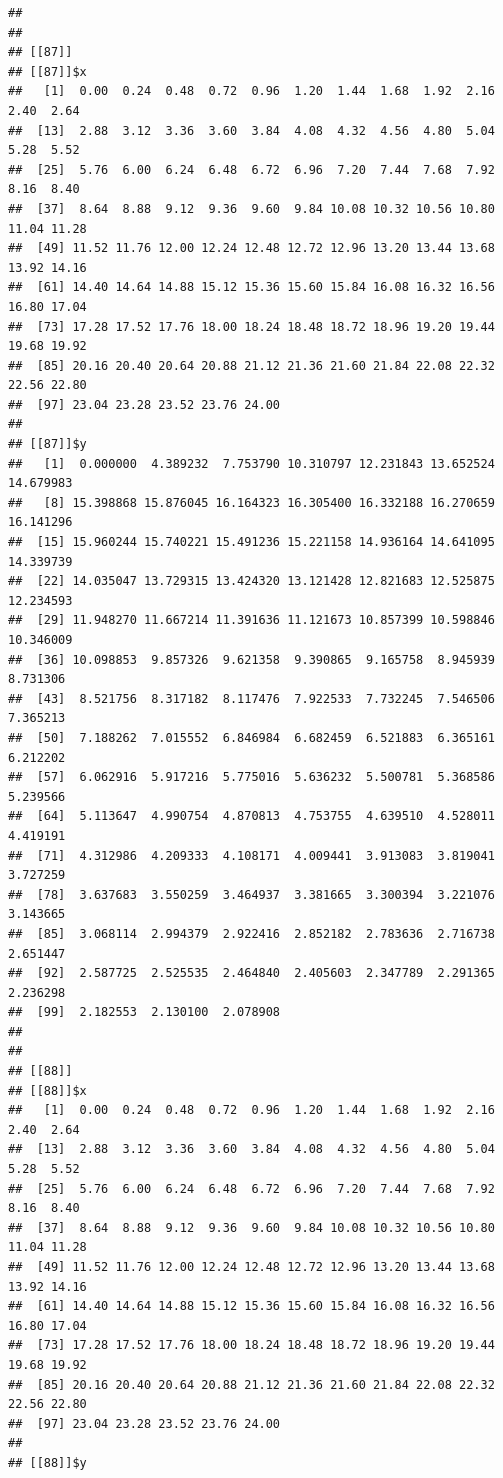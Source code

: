 \documentclass[
  ignorenonframetext,
]{beamer}
\begin{document}
\begin{frame}[fragile]{}
\begin{verbatim}
## 
## 
## [[87]]
## [[87]]$x
##   [1]  0.00  0.24  0.48  0.72  0.96  1.20  1.44  1.68  1.92  2.16  2.40  2.64
##  [13]  2.88  3.12  3.36  3.60  3.84  4.08  4.32  4.56  4.80  5.04  5.28  5.52
##  [25]  5.76  6.00  6.24  6.48  6.72  6.96  7.20  7.44  7.68  7.92  8.16  8.40
##  [37]  8.64  8.88  9.12  9.36  9.60  9.84 10.08 10.32 10.56 10.80 11.04 11.28
##  [49] 11.52 11.76 12.00 12.24 12.48 12.72 12.96 13.20 13.44 13.68 13.92 14.16
##  [61] 14.40 14.64 14.88 15.12 15.36 15.60 15.84 16.08 16.32 16.56 16.80 17.04
##  [73] 17.28 17.52 17.76 18.00 18.24 18.48 18.72 18.96 19.20 19.44 19.68 19.92
##  [85] 20.16 20.40 20.64 20.88 21.12 21.36 21.60 21.84 22.08 22.32 22.56 22.80
##  [97] 23.04 23.28 23.52 23.76 24.00
## 
## [[87]]$y
##   [1]  0.000000  4.389232  7.753790 10.310797 12.231843 13.652524 14.679983
##   [8] 15.398868 15.876045 16.164323 16.305400 16.332188 16.270659 16.141296
##  [15] 15.960244 15.740221 15.491236 15.221158 14.936164 14.641095 14.339739
##  [22] 14.035047 13.729315 13.424320 13.121428 12.821683 12.525875 12.234593
##  [29] 11.948270 11.667214 11.391636 11.121673 10.857399 10.598846 10.346009
##  [36] 10.098853  9.857326  9.621358  9.390865  9.165758  8.945939  8.731306
##  [43]  8.521756  8.317182  8.117476  7.922533  7.732245  7.546506  7.365213
##  [50]  7.188262  7.015552  6.846984  6.682459  6.521883  6.365161  6.212202
##  [57]  6.062916  5.917216  5.775016  5.636232  5.500781  5.368586  5.239566
##  [64]  5.113647  4.990754  4.870813  4.753755  4.639510  4.528011  4.419191
##  [71]  4.312986  4.209333  4.108171  4.009441  3.913083  3.819041  3.727259
##  [78]  3.637683  3.550259  3.464937  3.381665  3.300394  3.221076  3.143665
##  [85]  3.068114  2.994379  2.922416  2.852182  2.783636  2.716738  2.651447
##  [92]  2.587725  2.525535  2.464840  2.405603  2.347789  2.291365  2.236298
##  [99]  2.182553  2.130100  2.078908
## 
## 
## [[88]]
## [[88]]$x
##   [1]  0.00  0.24  0.48  0.72  0.96  1.20  1.44  1.68  1.92  2.16  2.40  2.64
##  [13]  2.88  3.12  3.36  3.60  3.84  4.08  4.32  4.56  4.80  5.04  5.28  5.52
##  [25]  5.76  6.00  6.24  6.48  6.72  6.96  7.20  7.44  7.68  7.92  8.16  8.40
##  [37]  8.64  8.88  9.12  9.36  9.60  9.84 10.08 10.32 10.56 10.80 11.04 11.28
##  [49] 11.52 11.76 12.00 12.24 12.48 12.72 12.96 13.20 13.44 13.68 13.92 14.16
##  [61] 14.40 14.64 14.88 15.12 15.36 15.60 15.84 16.08 16.32 16.56 16.80 17.04
##  [73] 17.28 17.52 17.76 18.00 18.24 18.48 18.72 18.96 19.20 19.44 19.68 19.92
##  [85] 20.16 20.40 20.64 20.88 21.12 21.36 21.60 21.84 22.08 22.32 22.56 22.80
##  [97] 23.04 23.28 23.52 23.76 24.00
## 
## [[88]]$y

\end{verbatim}
\end{frame}
\end{document}
